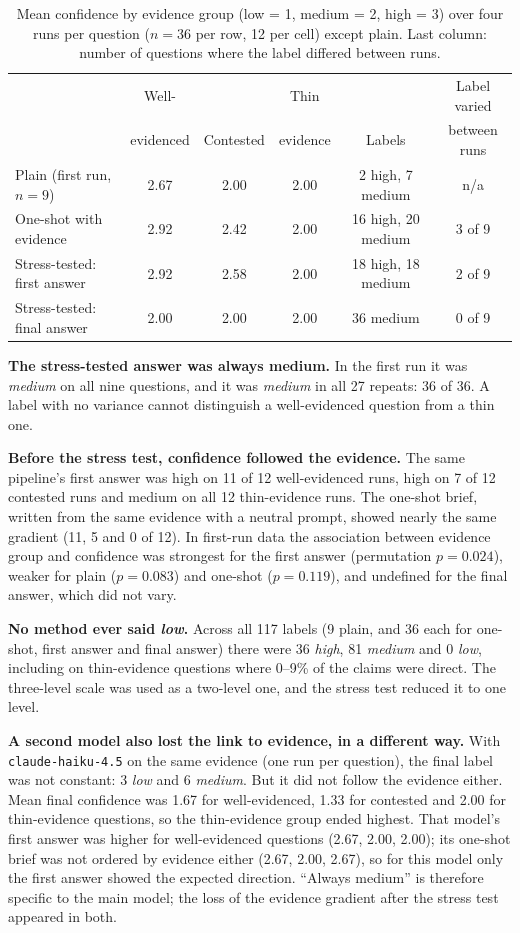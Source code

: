 \documentclass[11pt]{article}
\begin{document}
\begin{table}[h]
\centering
\small
\setlength{\tabcolsep}{4.5pt}
\begin{tabular}{lccccc}
\toprule
 & Well- & & Thin & & Label varied \\
 & evidenced & Contested & evidence & Labels & between runs \\
\midrule
Plain (first run, $n=9$) & 2.67 & 2.00 & 2.00 & 2 high, 7 medium & n/a \\
One-shot with evidence & 2.92 & 2.42 & 2.00 & 16 high, 20 medium & 3 of 9 \\
Stress-tested: first answer & 2.92 & 2.58 & 2.00 & 18 high, 18 medium & 2 of 9 \\
Stress-tested: final answer & 2.00 & 2.00 & 2.00 & 36 medium & 0 of 9 \\
\bottomrule
\end{tabular}
\caption{Mean confidence by evidence group (low = 1, medium = 2, high = 3) over four runs per question ($n=36$ per row, 12 per cell) except plain. Last column: number of questions where the label differed between runs.}
\label{tab:tier}
\end{table}

\textbf{The stress-tested answer was always medium.} In the first run it was \emph{medium} on all nine questions, and it was \emph{medium} in all 27 repeats: 36 of 36. A label with no variance cannot distinguish a well-evidenced question from a thin one.

\textbf{Before the stress test, confidence followed the evidence.} The same pipeline's first answer was high on 11 of 12 well-evidenced runs, high on 7 of 12 contested runs and medium on all 12 thin-evidence runs. The one-shot brief, written from the same evidence with a neutral prompt, showed nearly the same gradient (11, 5 and 0 of 12). In first-run data the association between evidence group and confidence was strongest for the first answer (permutation $p = 0.024$), weaker for plain ($p = 0.083$) and one-shot ($p = 0.119$), and undefined for the final answer, which did not vary.

\textbf{No method ever said \emph{low}.} Across all 117 labels (9 plain, and 36 each for one-shot, first answer and final answer) there were 36 \emph{high}, 81 \emph{medium} and 0 \emph{low}, including on thin-evidence questions where 0--9\% of the claims were direct. The three-level scale was used as a two-level one, and the stress test reduced it to one level.

\textbf{A second model also lost the link to evidence, in a different way.} With \texttt{claude-haiku-4.5} on the same evidence (one run per question), the final label was not constant: 3 \emph{low} and 6 \emph{medium}. But it did not follow the evidence either. Mean final confidence was 1.67 for well-evidenced, 1.33 for contested and 2.00 for thin-evidence questions, so the thin-evidence group ended highest. That model's first answer was higher for well-evidenced questions (2.67, 2.00, 2.00); its one-shot brief was not ordered by evidence either (2.67, 2.00, 2.67), so for this model only the first answer showed the expected direction. ``Always medium'' is therefore specific to the main model; the loss of the evidence gradient after the stress test appeared in both.
\end{document}
